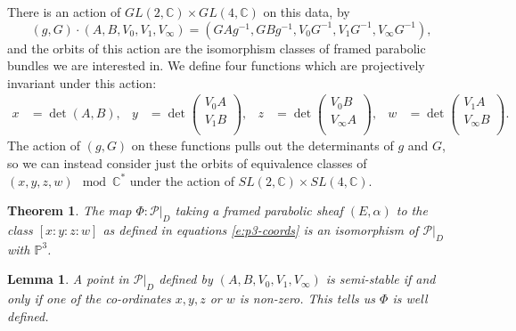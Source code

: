 \documentclass[]{article}
\newtheorem{lemma}{Lemma}
\newtheorem{theorem}{Theorem}
\newcommand{\C}{\mathbb{C}}
\newcommand{\cP}{\mathcal{P}}
\newcommand{\PP}{\mathbb{P}}
\begin{document}
	There is an action of $GL(2,\C)\times GL(4,\C)$ on this data, by
	\begin{equation}
		\label{e:p3-conds}
		(g,G)\cdot (A,B,V_0,V_1,V_\infty) = (GAg^{-1}, GBg^{-1}, V_0G^{-1}, V_1G^{-1}, V_\infty G^{-1}),
	\end{equation}
	and the orbits of this action are the isomorphism classes of framed parabolic bundles we are interested in. We define four functions which are projectively invariant under this action:
	\begin{align}
		\label{e:p3-coords}
		x&=\det(A,B),& y&=\det\begin{pmatrix}
		V_0 A\\
		V_1 B\\
		\end{pmatrix}, & z&= \det\begin{pmatrix}
		V_0 B\\
		V_\infty A\\
		\end{pmatrix}, & w&= \det\begin{pmatrix}
		V_1 A\\
		V_\infty B\\
		\end{pmatrix}.
	\end{align}
	The action of $(g,G)$ on these functions pulls out the determinants of $g$ and $G$, so we can instead consider just the orbits of equivalence classes of $(x,y,z,w) \mod \C^\ast$ under the action of $SL(2,\C)\times SL(4,\C)$. 
	\begin{theorem}
		\label{t:p3-iso}
		The map $\Phi:\cP|_D$ taking a framed parabolic sheaf $(E,\alpha)$ to the class $[x:y:z:w]$ as defined in equations \ref{e:p3-coords} is an isomorphism of $\cP|_D$ with $\PP^3$. 
	\end{theorem}
	\begin{lemma}
		A point in $\cP|_D$ defined by $(A,B,V_0,V_1,V_\infty)$ is semi-stable if and only if one of the co-ordinates $x,y,z$ or $w$ is non-zero. This tells us $\Phi$ is well defined.
	\end{lemma}
\end{document}
